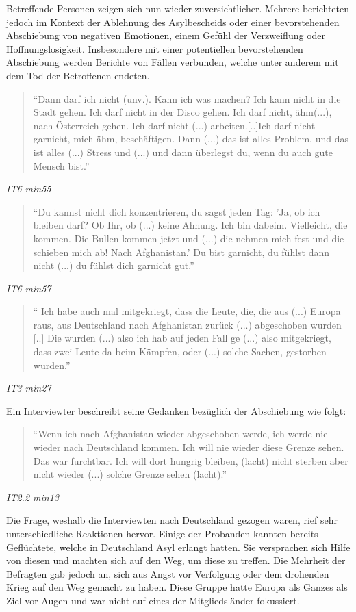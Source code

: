 Betreffende Personen zeigen sich nun wieder zuversichtlicher. Mehrere berichteten jedoch im Kontext der Ablehnung des Asylbescheids oder einer bevorstehenden Abschiebung von negativen Emotionen, einem Gefühl der Verzweiflung oder Hoffnungslosigkeit. Insbesondere mit einer potentiellen bevorstehenden Abschiebung werden Berichte von Fällen verbunden, welche unter anderem mit dem Tod der Betroffenen endeten.
\begin{quote}
    ``Dann darf ich nicht (unv.). Kann ich was machen? Ich kann nicht in die Stadt gehen. Ich darf nicht in der Disco gehen. Ich darf nicht, ähm(...), nach Österreich gehen. Ich darf nicht (...) arbeiten.[..]Ich darf nicht garnicht, mich ähm, beschäftigen. Dann (...) das ist alles Problem, und das ist alles (...) Stress und (...) und dann überlegst du, wenn du auch gute Mensch bist.''
\end{quote}
\centerline{\textit{IT6 min55}}
\begin{quote}
    ``Du kannst nicht dich konzentrieren, du sagst jeden Tag: 'Ja, ob ich bleiben darf? Ob Ihr, ob (...) keine Ahnung. Ich bin dabeim. Vielleicht, die kommen. Die Bullen kommen jetzt und (...) die nehmen mich fest und die schieben mich ab! Nach Afghanistan.' Du bist garnicht, du fühlst dann nicht (...) du fühlst dich garnicht gut.''
\end{quote}
\centerline{\textit{IT6 min57}}
\begin{quote}
    `` Ich habe auch mal mitgekriegt, dass die Leute, die, die aus (...) Europa raus, aus Deutschland nach Afghanistan zurück (...) abgeschoben wurden [..] Die wurden (...) also ich hab auf jeden Fall ge (...) also mitgekriegt, dass zwei Leute da beim Kämpfen, oder (...) solche Sachen, gestorben wurden.''
\end{quote}
\centerline{\textit{IT3 min27}}
Ein Interviewter beschreibt seine Gedanken bezüglich der Abschiebung wie folgt:
\begin{quote}
    ``Wenn ich nach Afghanistan wieder abgeschoben werde, ich werde nie wieder nach Deutschland kommen. Ich will nie wieder diese Grenze sehen. Das war furchtbar. Ich will dort hungrig bleiben, (lacht) nicht sterben aber nicht wieder (...) solche Grenze sehen (lacht).''
\end{quote}
\centerline{\textit{IT2.2 min13}}

Die Frage, weshalb die Interviewten nach Deutschland gezogen waren, rief sehr unterschiedliche Reaktionen hervor.\newline
Einige der Probanden kannten bereits Geflüchtete, welche in Deutschland Asyl erlangt hatten. Sie versprachen sich Hilfe von diesen und machten sich auf den Weg, um diese zu treffen.\newline
Die Mehrheit der Befragten gab jedoch an, sich aus Angst vor Verfolgung oder dem drohenden Krieg auf den Weg gemacht zu haben. Diese Gruppe hatte Europa als Ganzes als Ziel vor Augen und war nicht auf eines der Mitgliedsländer fokussiert.\newline

